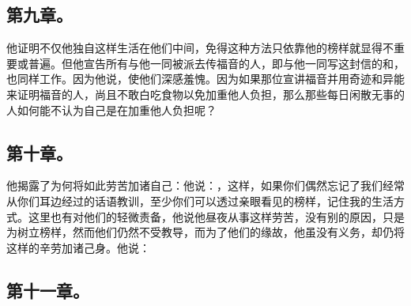 
\subsection{第九章。}

\par

他证明不仅他独自这样生活在他们中间，免得这种方法只依靠他的榜样就显得不重要或普遍。但他宣告所有与他一同被派去传福音的人，即与他一同写这封信的和，也同样工作。因为他说，使他们深感羞愧。因为如果那位宣讲福音并用奇迹和异能来证明福音的人，尚且不敢白吃食物以免加重他人负担，那么那些每日闲散无事的人如何能不认为自己是在加重他人负担呢？\par


\subsection{第十章。}

\par

他揭露了为何将如此劳苦加诸自己：他说：，这样，如果你们偶然忘记了我们经常从你们耳边经过的话语教训，至少你们可以透过亲眼看见的榜样，记住我的生活方式。这里也有对他们的轻微责备，他说他昼夜从事这样劳苦，没有别的原因，只是为树立榜样，然而他们仍然不受教导，而为了他们的缘故，他虽没有义务，却仍将这样的辛劳加诸己身。他说：\par


\subsection{第十一章。}


